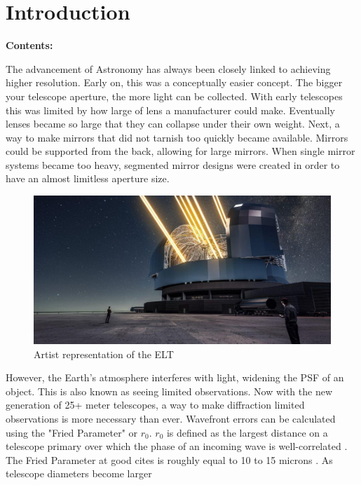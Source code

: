 
\chapter{Introduction} %

\noindent\textbf{\large Contents:}

\noindent\hrulefill
\noindent\startcontents[chapters]
\noindent{}
\noindent\hrulefill

\label{Chapter1} %




The advancement of Astronomy has always been closely linked to achieving higher
resolution.  Early on, this was a conceptually easier concept.  The bigger your
telescope aperture, the more light can be collected.  With early telescopes this was
limited by how large of lens a manufacturer could make.  Eventually lenses became so
large that they can collapse under their own weight.  Next, a way to make mirrors
that did not tarnish too quickly became available.  Mirrors could be supported from
the back, allowing for large mirrors.  When single mirror systems became too heavy,
segmented mirror designs were created in order to have an almost limitless aperture
size.  

\begin{figure}[h!]
\centering
\includegraphics[width=14cm]{Figures/ELT_las.jpg}
\caption{Artist representation of the ELT}
\label{fig:ELT_las}
\end{figure}


However, the Earth's atmosphere interferes with light, widening the PSF of an  
object.  This is also known as seeing limited observations.  Now with the new
generation of 25+ meter telescopes, a way to make diffraction limited observations
is more necessary than ever.  Wavefront errors can be calculated using the "Fried
Parameter" or $r_0$.  $r_0$ is defined as the largest distance on a telescope primary
over which the phase of an incoming wave is well-correlated \cite{max_2019}.  The Fried
Parameter at good cites is roughly equal to 10 to 15 microns \cite{max_2019}.  As telescope diameters become larger 

